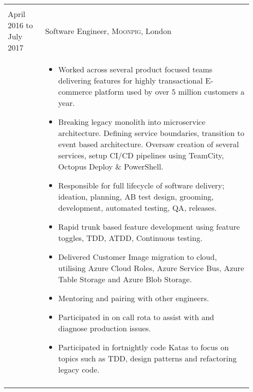 \documentclass[a4paper,10pt]{article} %
\begin{document}
\begin{tabular}{ L{2cm} | L{11cm}}
	 \\
	April 2016 to July 2017 & Software Engineer, \textsc{Moonpig}, London \\
	&\MPtrue
	\begin{itemize}[leftmargin=*]
			\item Worked across several product focused teams delivering features for highly transactional E-commerce platform used by over 5 million customers a year.
			\item Breaking legacy monolith into microservice architecture. Defining service boundaries, transition to event based architecture. Oversaw creation of several services, setup CI/CD pipelines using TeamCity, Octopus Deploy \& PowerShell.
			\item Responsible for full lifecycle of software delivery; ideation, planning, AB test design, grooming, development, automated testing, QA, releases. 
			\item Rapid trunk based feature development using feature toggles, TDD, ATDD, Continuous testing.
			\item Delivered Customer Image migration to cloud, utilising Azure Cloud Roles, Azure Service Bus, Azure Table Storage and Azure Blob Storage.
			\item Mentoring and pairing with other engineers.
			\item Participated in on call rota to assist with and diagnose production issues.
			\item Participated in fortnightly code Katas to focus on topics such as TDD, design patterns and refactoring legacy code.
		\end{itemize} \\ 
	 \\
\end{tabular}
\end{document}
